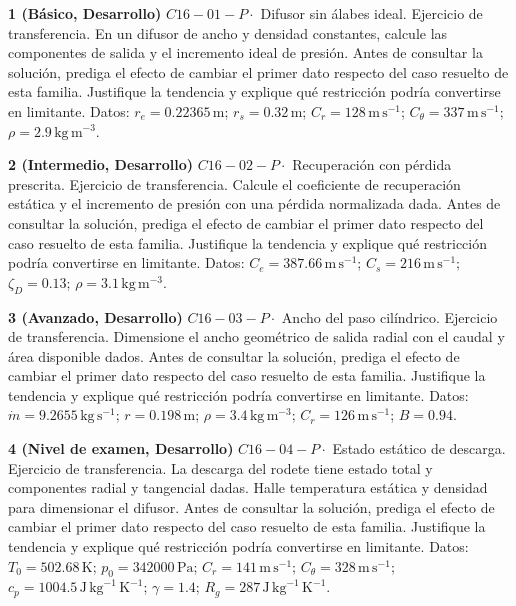 \documentclass[10pt,openany]{book}
\begin{document}
\begin{tcolorbox}[title={Ejercicios propuestos}, studiumworked, breakable]

\noindent\textbf{1 (Básico, Desarrollo)}
\(C16-01-P \cdot\) Difusor sin álabes ideal. Ejercicio de transferencia. En un difusor de ancho y densidad constantes, calcule las componentes de salida y el incremento ideal de presión. Antes de consultar la solución, prediga el efecto de cambiar el primer dato respecto del caso resuelto de esta familia. Justifique la tendencia y explique qué restricción podría convertirse en limitante. Datos: \(r_e=0.22365\, \mathrm{m}\); \(r_s=0.32\, \mathrm{m}\); \(C_r=128\, \mathrm{m}\,\mathrm{s}^{-1}\); \(C_\theta=337\, \mathrm{m}\,\mathrm{s}^{-1}\); \(\rho=2.9\, \mathrm{kg}\,\mathrm{m}^{-3}\).

\noindent\textbf{2 (Intermedio, Desarrollo)}
\(C16-02-P \cdot\) Recuperación con pérdida prescrita. Ejercicio de transferencia. Calcule el coeficiente de recuperación estática y el incremento de presión con una pérdida normalizada dada. Antes de consultar la solución, prediga el efecto de cambiar el primer dato respecto del caso resuelto de esta familia. Justifique la tendencia y explique qué restricción podría convertirse en limitante. Datos: \(C_e=387.66\, \mathrm{m}\,\mathrm{s}^{-1}\); \(C_s=216\, \mathrm{m}\,\mathrm{s}^{-1}\); \(\zeta_D=0.13\); \(\rho=3.1\, \mathrm{kg}\,\mathrm{m}^{-3}\).

\noindent\textbf{3 (Avanzado, Desarrollo)}
\(C16-03-P \cdot\) Ancho del paso cilíndrico. Ejercicio de transferencia. Dimensione el ancho geométrico de salida radial con el caudal y área disponible dados. Antes de consultar la solución, prediga el efecto de cambiar el primer dato respecto del caso resuelto de esta familia. Justifique la tendencia y explique qué restricción podría convertirse en limitante. Datos: \(\dot m=9.2655\, \mathrm{kg}\,\mathrm{s}^{-1}\); \(r=0.198\, \mathrm{m}\); \(\rho=3.4\, \mathrm{kg}\,\mathrm{m}^{-3}\); \(C_r=126\, \mathrm{m}\,\mathrm{s}^{-1}\); \(B=0.94\).

\noindent\textbf{4 (Nivel de examen, Desarrollo)}
\(C16-04-P \cdot\) Estado estático de descarga. Ejercicio de transferencia. La descarga del rodete tiene estado total y componentes radial y tangencial dadas. Halle temperatura estática y densidad para dimensionar el difusor. Antes de consultar la solución, prediga el efecto de cambiar el primer dato respecto del caso resuelto de esta familia. Justifique la tendencia y explique qué restricción podría convertirse en limitante. Datos: \(T_0=502.68\, \mathrm{K}\); \(p_0=342000\, \mathrm{Pa}\); \(C_r=141\, \mathrm{m}\,\mathrm{s}^{-1}\); \(C_\theta=328\, \mathrm{m}\,\mathrm{s}^{-1}\); \(c_p=1004.5\, \mathrm{J}\,\mathrm{kg}^{-1}\,\mathrm{K}^{-1}\); \(\gamma=1.4\); \(R_g=287\, \mathrm{J}\,\mathrm{kg}^{-1}\,\mathrm{K}^{-1}\).
\end{tcolorbox}
\end{document}
